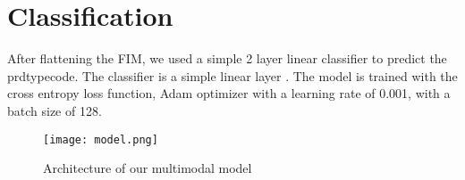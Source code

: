 \section{Classification}

After flattening  the FIM, we used a simple 2 layer linear classifier to predict the prdtypecode. The classifier is a simple linear layer . The model is trained with the cross entropy loss function, Adam optimizer with a learning rate of 0.001, with a batch size of 128.


\begin{figure}[H]
    \centering
    \texttt{[image: model.png]}
    \caption{Architecture of our multimodal model}
    \label{fig:model}
\end{figure}